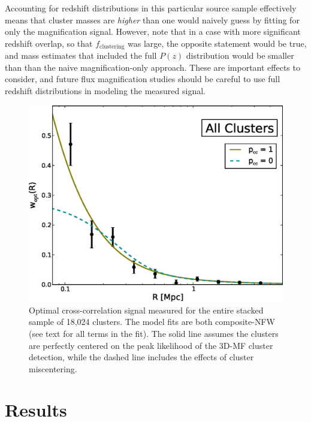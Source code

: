 Accounting for redshift distributions in this particular source sample effectively means that cluster masses are {\it higher} than one would naively guess by fitting for only the magnification signal. However, note that in a case with more significant redshift overlap, so that $f_{\mathrm{clustering}}$ was large, the opposite statement would be true, and mass estimates that included the full $P(z)$ distribution would be smaller than than the naive magnification-only approach. These are important effects to consider, and future flux magnification studies should be careful to use full redshift distributions in modeling the measured signal.



\begin{figure}
\begin{center}
\includegraphics[scale=0.7]{plots_ch3/wopt_allClusters_U.eps}
\caption[Magnification for all Stacked \ac{3D-MF} Clusters]{Optimal cross-correlation signal measured for the entire stacked sample of 18,024 clusters. The model fits are both composite-\ac{NFW} (see text for all terms in the fit). The solid line assumes the clusters are perfectly centered on the peak likelihood of the \ac{3D-MF} cluster detection, while the dashed line includes the effects of cluster miscentering.}
\label{w_all}
\end{center}
\end{figure}


\section{Results}
\label{results}

